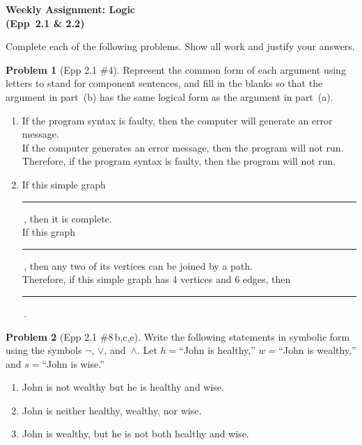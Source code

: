 \documentclass[11pt]{article}
\begin{document}
\begin{center}
  {\Large\bfseries Weekly Assignment: Logic\\[2pt]
   (Epp~2.1 \& 2.2)}
\end{center}

\bigskip

\noindent
Complete each of the following problems.  Show all work and justify your answers.

\bigskip

\noindent\textbf{Problem 1} (Epp 2.1 \#4). \;
Represent the common form of each argument using letters to
stand for component sentences, and fill in the blanks so that the
argument in part~(b) has the same logical form as the argument
in part~(a).

\begin{enumerate}[label=\textbf{\alph*.},itemsep=6pt]
  \item If the program syntax is faulty, then the computer will
        generate an error message.\\
        If the computer generates an error message, then the
        program will not run.\\
        Therefore, if the program syntax is faulty, then the
        program will not run.

  \item If this simple graph \rule{2cm}{0.4pt}\,, then it is complete.\\
        If this graph \rule{2cm}{0.4pt}\,, then any two of its
        vertices can be joined by a path.\\
        Therefore, if this simple graph has 4 vertices and 6 edges,
        then \rule{2cm}{0.4pt}\,.
\end{enumerate}

\bigskip

\noindent\textbf{Problem 2} (Epp 2.1 \#8\,b,c,e). \;
Write the following statements in symbolic form using the
symbols $\lnot$, $\lor$, and~$\land$.  Let $h ={}$``John is
healthy,'' $w ={}$``John is wealthy,'' and $s ={}$``John is
wise.''

\begin{enumerate}[label=\textbf{\alph*.},start=2,itemsep=4pt]
  \item John is not wealthy but he is healthy and wise.
  \setcounter{enumi}{2}
  \item John is neither healthy, wealthy, nor wise.
  \setcounter{enumi}{4}
  \item John is wealthy, but he is not both healthy and wise.
\end{enumerate}
\end{document}
